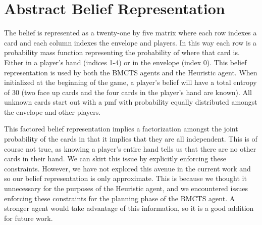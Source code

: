 \documentclass[msc, ai, twoside, notimes, logo, parskip, leftchapter, normalheadings]{infthesis}
\begin{document}
\chapter{Abstract Belief Representation}
The belief is represented as a twenty-one by five matrix where each row indexes a card and each column indexes the envelope and players. In this way each row is a probability mass function representing the probability of where that card is. Either in a player's hand (indices 1-4) or in the envelope (index 0). This belief representation is used by both the BMCTS agents and the Heuristic agent. When initialized at the beginning of the game, a player's belief will have a total entropy of 30 (two face up cards and the four cards in the player's hand are known). All unknown cards start out with a pmf with probability equally distributed amongst the envelope and other players. 

This factored belief representation implies a factorization amongst the joint probability of the cards in that it implies that they are all independent. This is of course not true, as knowing a player's entire hand tells us that there are no other cards in their hand. We can skirt this issue by explicitly enforcing these constraints. However, we have not explored this avenue in the current work and so our belief representation is only approximate. This is because we thought it unnecessary for the purposes of the Heuristic agent, and we encountered issues enforcing these constraints for the planning phase of the BMCTS agent. A stronger agent would take advantage of this information, so it is a good addition for future work.

\newpage
\nocite{*}
 

\end{document}
